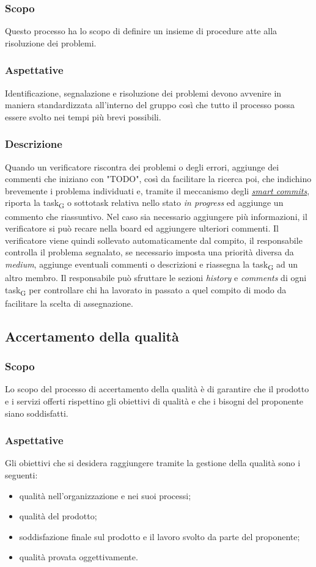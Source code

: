     \subsubsection{Scopo}
        Questo processo ha lo scopo di definire un insieme di procedure atte alla risoluzione dei problemi.
    \subsubsection{Aspettative}
        Identificazione, segnalazione e risoluzione dei problemi devono avvenire in maniera standardizzata all'interno del gruppo così che tutto il processo possa essere svolto nei tempi più brevi possibili.
    \subsubsection{Descrizione}
        Quando un verificatore riscontra dei problemi o degli errori, aggiunge dei commenti che iniziano con "TODO", così da facilitare la ricerca poi, che indichino brevemente i problema individuati e, tramite il meccanismo degli \hyperref[jiraintegration]{\textit{smart commits}}, riporta la \gls{task}\textsubscript{G} o sottotask relativa nello stato \textit{in progress} ed aggiunge un commento che riassuntivo. Nel caso sia necessario aggiungere più informazioni, il verificatore si può recare nella board ed aggiungere ulteriori commenti. Il verificatore viene quindi sollevato automaticamente dal compito, il responsabile controlla il problema segnalato, se necessario imposta una priorità diversa da \textit{medium}, aggiunge eventuali commenti o descrizioni e riassegna la \gls{task}\textsubscript{G} ad un altro membro. Il responsabile può sfruttare le sezioni \textit{history} e \textit{comments} di ogni \gls{task}\textsubscript{G} per controllare chi ha lavorato in passato a quel compito di modo da facilitare la scelta di assegnazione.

\subsection{Accertamento della qualità} 
    \subsubsection{Scopo}
    Lo scopo del processo di accertamento della qualità è di garantire che il prodotto e i servizi offerti rispettino gli obiettivi di qualità e che i bisogni del proponente siano soddisfatti.
    \subsubsection{Aspettative}
    Gli obiettivi che si desidera raggiungere tramite la gestione della qualità sono i seguenti:
    \begin{itemize}
    	\item qualità nell'organizzazione e nei suoi processi;
    	\item qualità del prodotto;
    	\item soddisfazione finale sul prodotto e il lavoro svolto da parte del proponente;
    	\item qualità provata oggettivamente.
    \end{itemize}
